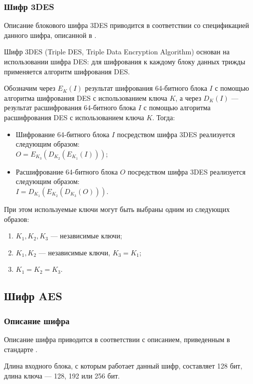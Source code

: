 \documentclass{./civarticle}
\begin{document}
\subsubsection{Шифр 3DES}

Описание блокового шифра 3DES приводится в соответствии со спецификацией данного шифра, описанной в \cite{3des}.

Шифр 3DES (Triple DES, Triple Data Encryption Algorithm) основан на использовании шифра DES: для шифрования к каждому блоку данных трижды применяется алгоритм шифрования DES.

Обозначим через $E_K(I)$ результат шифрования 64-битного блока $I$ с помощью алгоритма шифрования DES с использованием ключа $K$, а через $D_K(I)$ --- результат расшифрования 64-битного блока $I$ с помощью алгоритма расшифрования DES с использованием ключа $K$. Тогда:
\begin{itemize}
    \item Шифрование 64-битного блока $I$ посредством шифра 3DES реализуется следующим образом:\\ $O = E_{K_3}(D_{K_2}(E_{K_1}(I)))$;
    \item Расшифрование 64-битного блока $O$ посредством шифра 3DES реализуется следующим образом:\\ $I = D_{K_1}(E_{K_2}(D_{K_3}(O)))$.
\end{itemize}

При этом используемые ключи могут быть выбраны одним из следующих образов:
\begin{enumerate}
    \item $K_1, K_2, K_3$ --- независимые ключи;
    \item $K_1, K_2$ --- независимые ключи, $K_3 = K_1$;
    \item $K_1 = K_2 = K_3$.
\end{enumerate}

\subsection{Шифр AES}

\subsubsection{Описание шифра}

Описание шифра приводится в соответствии с описанием, приведенным в стандарте \cite{aesdesc}.

Длина входного блока, с которым работает данный шифр, составляет 128 бит, длина ключа --- 128, 192 или 256 бит.
\end{document}
